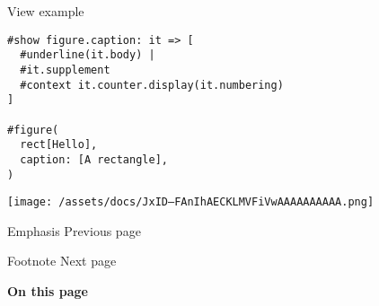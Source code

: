 
View example

\begin{verbatim}
#show figure.caption: it => [
  #underline(it.body) |
  #it.supplement
  #context it.counter.display(it.numbering)
]

#figure(
  rect[Hello],
  caption: [A rectangle],
)
\end{verbatim}

\texttt{[image: /assets/docs/JxID--FAnIhAECKLMVFiVwAAAAAAAAAA.png]}

\href{/docs/reference/model/emph/}{\pandocbounded{}}

{ Emphasis } { Previous page }

\href{/docs/reference/model/footnote/}{\pandocbounded{}}

{ Footnote } { Next page }

\textbf{On this page}

